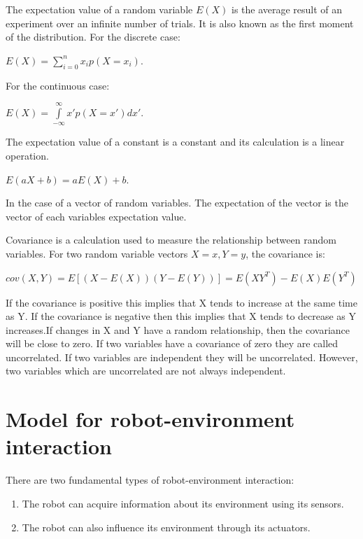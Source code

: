 \documentclass[twoside]{article}
\begin{document}
The expectation value of a random variable $E(X)$ is the average result of an experiment over an infinite number of trials. It is also known as the first moment of the distribution. For the discrete case:

\begin{center}
$E(X)= \sum\limits_{i = 0}^{n} x_ip(X=x_i)$.
\end{center}

For the continuous case:

\begin{center}
$E(X)= \int\limits_{-\infty}^{\infty}  x'p(X=x')dx'$.
\end{center}

The expectation value of a constant is a constant and its calculation is a linear operation.

\begin{center}
$E(aX + b)= aE(X) + b$.
\end{center}

In the case of a vector of random variables. The expectation of the vector is the vector of each variables expectation value.

Covariance is a calculation used to measure the relationship between random variables. For two random variable vectors $X=x, Y=y$, the covariance is:

\begin{center}
$cov(X,Y)=E[(X-E(X))(Y-E(Y))] = E(XY^T) - E(X)E(Y^T)$
\end{center}

If the covariance is positive this implies that X tends to increase at the same time as Y. If the covariance is negative then this implies that X tends to decrease as Y increases.If changes in X and Y have a random relationship, then the covariance will be close to zero. If two variables have a covariance of zero they are called uncorrelated. If two variables are independent they will be uncorrelated. However, two variables which are uncorrelated are not always independent.

\section{Model for robot-environment interaction\cite{thrun2005probabilistic}}
There are two fundamental types of robot-environment interaction:
\begin{enumerate}
  \item The robot can acquire information about its environment using its sensors.

  \item The robot can also influence its environment through its actuators.
\end{enumerate}
\end{document}

